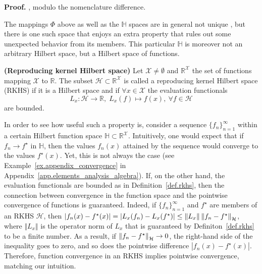 \begin{my_proof}
	\textbf{Proof.}
	\cite[Theorem~4.16]{steinwart2008svm_book}, modulo the nomenclature difference.
\end{my_proof}

The mappings $\Phi$ above as well as the $\mathbb{H}$ spaces are in general not unique \citep[§4]{steinwart2008svm_book}, but there is one such space that enjoys an extra property that rules out some unexpected behavior from its members. This particular $\mathbb{H}$ is moreover not an arbitrary Hilbert space, but a Hilbert space of functions.

\begin{definition}
	\label{def.rkhs}
	\textbf{(Reproducing kernel Hilbert space)} 
	Let $\mathcal{X} \neq \emptyset$ and $\mathbb{R}^\mathcal{X}$ the set of functions mapping $\mathcal{X}$ to $\mathbb{R}$. The subset $\mathcal{H} \subset \mathbb{R}^\mathcal{X}$ is called a reproducing kernel Hilbert space (RKHS) if it is a Hilbert space and if $\forall x \in \mathcal{X}$ the evaluation functionals
	\begin{equation}
		L_x: \mathcal{H} \rightarrow \mathbb{R}, \; L_x(f) \mapsto f(x), \ \forall f\in \mathcal{H}
	\end{equation}
	are bounded.
\end{definition}

In order to see how useful such a property is, consider a sequence $\{f_n\}_{n=1}^\infty$ within a certain Hilbert function space $\mathbb{H} \subset \mathbb{R}^\mathcal{X}$. Intuitively, one would expect that if $f_n \rightarrow f^\star$ in $\mathbb{H}$, then the values $f_n(x)$ attained by the sequence would converge to the values $f^\star(x)$. Yet, this is not always the case (see Example~\ref{ex.appendix_convergence} in Appendix~\ref{app.elements_analysis_algebra}). If, on the other hand, the evaluation functionals are bounded as in Definition~\ref{def.rkhs}, then the connection between convergence in the function space and the pointwise convergence of functions is guaranteed. Indeed, if $\{f_n\}_{n=1}^\infty$ and $f^\star$ are members of an RKHS $\mathcal{H}$, then $|f_n(x)-f^\star(x)| = | L_x(f_n) - L_x(f^\star)|  \leq \Vert L_x \Vert \left\| f_n - f^\star \right\|_\mathcal{H}$, where $\Vert L_x \Vert $ is the operator norm of $L_x$ that is guaranteed by Definiton~\ref{def.rkhs} to be a finite number. As a result, if $\left\| f_n - f^\star \right\|_\mathcal{H} \rightarrow 0$, the right-hand side of the inequality goes to zero, and so does the pointwise difference $|f_n(x)-f^\star(x)|$. Therefore, function convergence in an RKHS implies pointwise convergence, matching our intuition.

